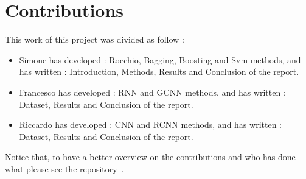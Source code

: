 \section{Contributions}
This work of this project was divided as follow :
\begin{itemize}
    \item Simone has developed : Rocchio, Bagging, Boosting and Svm methods, and has written : Introduction, Methods, Results and Conclusion of the report.
    \item Francesco has developed : RNN and GCNN methods, and has written : Dataset, Results and Conclusion of the report.
    \item Riccardo has developed : CNN and RCNN methods, and has written : Dataset, Results and Conclusion of the report.   
\end{itemize}
Notice that, to have a better overview on the contributions and who has done what please see the repository~\cite{github-code}.